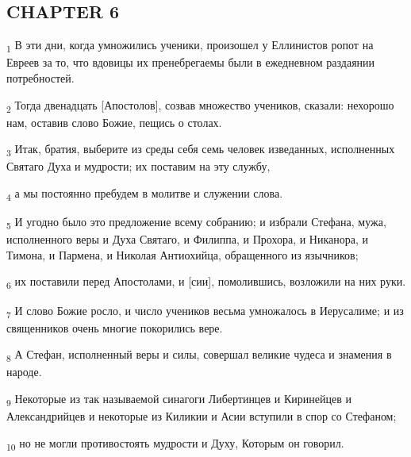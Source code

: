 \subsection{CHAPTER 6}
\begin{tcolorbox}
\textsubscript{1} В эти дни, когда умножились ученики, произошел у Еллинистов ропот на Евреев за то, что вдовицы их пренебрегаемы были в ежедневном раздаянии потребностей.
\end{tcolorbox}
\begin{tcolorbox}
\textsubscript{2} Тогда двенадцать [Апостолов], созвав множество учеников, сказали: нехорошо нам, оставив слово Божие, пещись о столах.
\end{tcolorbox}
\begin{tcolorbox}
\textsubscript{3} Итак, братия, выберите из среды себя семь человек изведанных, исполненных Святаго Духа и мудрости; их поставим на эту службу,
\end{tcolorbox}
\begin{tcolorbox}
\textsubscript{4} а мы постоянно пребудем в молитве и служении слова.
\end{tcolorbox}
\begin{tcolorbox}
\textsubscript{5} И угодно было это предложение всему собранию; и избрали Стефана, мужа, исполненного веры и Духа Святаго, и Филиппа, и Прохора, и Никанора, и Тимона, и Пармена, и Николая Антиохийца, обращенного из язычников;
\end{tcolorbox}
\begin{tcolorbox}
\textsubscript{6} их поставили перед Апостолами, и [сии], помолившись, возложили на них руки.
\end{tcolorbox}
\begin{tcolorbox}
\textsubscript{7} И слово Божие росло, и число учеников весьма умножалось в Иерусалиме; и из священников очень многие покорились вере.
\end{tcolorbox}
\begin{tcolorbox}
\textsubscript{8} А Стефан, исполненный веры и силы, совершал великие чудеса и знамения в народе.
\end{tcolorbox}
\begin{tcolorbox}
\textsubscript{9} Некоторые из так называемой синагоги Либертинцев и Киринейцев и Александрийцев и некоторые из Киликии и Асии вступили в спор со Стефаном;
\end{tcolorbox}
\begin{tcolorbox}
\textsubscript{10} но не могли противостоять мудрости и Духу, Которым он говорил.
\end{tcolorbox}
